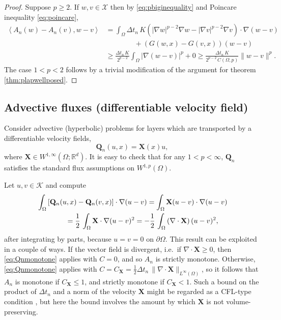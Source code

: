 \documentclass[final,leqno,onefignum,onetabnum]{siamltex1213bueler}
\newcommand\bQ{\mathbf{Q}}
\newcommand\bX{\mathbf{X}}
\newcommand{\Div}{\nabla\cdot}
\renewcommand{\grad}{\nabla}
\newcommand{\ip}[2]{\ensuremath{\left<#1,#2\right>}}
\newcommand\RR{\mathbb{R}}
\begin{document}
\begin{proof}
Suppose $p\ge 2$.  If $w,v\in\mathcal{X}$ then by \eqref{eq:pbiginequality} and Poincare inequality \eqref{eq:poincare},
\begin{align*}
\ip{A_n(w)-A_n(v)}{w-v} &= \int_\Omega \Delta t_n\, K \left(|\grad w|^{p-2} \grad w - |\grad v|^{p-2} \grad v\right) \cdot \grad (w-v) \\
  &\qquad\qquad + \left(G(w,x) - G(v,x)\right) (w-v) \\
  &\ge \frac{\Delta t_n\,K}{2^{p-2}} \int_\Omega |\grad (w-v)|^p + 0 \ge \frac{\Delta t_n\,K}{2^{p-2}\, C(\Omega,p)} \|w-v\|^p.
\end{align*}
The case $1<p<2$ follows by a trivial modification of the argument for theorem \ref{thm:plapwellposed}.
\end{proof}

\subsection{Advective fluxes (differentiable velocity field)} \label{subsec:advect}  Consider advective (hyperbolic) problems for layers which are transported by a differentiable velocity fields,
\begin{equation}
  \bQ_n(u,x) = \bX(x) u, \label{eq:advectflux}
\end{equation}
where $\bX \in W^{1,\infty}(\Omega;\RR^d)$.  It is easy to check that for any $1<p<\infty$, $\bQ_n$ satisfies the standard flux assumptions on $W^{1,p}(\Omega)$.

Let $u,v\in\mathcal{K}$ and compute
\begin{align}
   &\int_\Omega \left[\bQ_n(u,x) - \bQ_n(v,x)\right] \cdot \grad (u - v) = \int_\Omega \bX (u-v) \cdot \grad (u - v)   \label{eq:advectQnmono} \\
   &\qquad\qquad = \frac{1}{2}\,\int_\Omega \bX \cdot \grad (u - v)^2 = - \frac{1}{2}\,\int_\Omega \left(\Div\bX\right) (u - v)^2, \notag
\end{align}
after integrating by parts, because $u=v=0$ on $\partial \Omega$.  This result can be exploited in a couple of ways.  If the vector field is divergent, i.e.~if $\Div\bX\ge 0$, then \eqref{eq:Qnmonotone} applies with $C=0$, and so $A_n$ is strictly monotone.  Otherwise, \eqref{eq:Qnmonotone} applies with $C = C_\bX = \frac{1}{2}\Delta t_n\,\|\Div\bX\|_{L^\infty(\Omega)}$, so it follows that $A_n$ is monotone if $C_\bX \le 1$, and strictly monotone if $C_\bX < 1$.  Such a bound on the product of $\Delta t_n$ and a norm of the velocity $\bX$ might be regarded as a CFL-type condition \cite{LeVeque2002}, but here the bound involves the amount by which $\bX$ is not volume-preserving.
\end{document}
